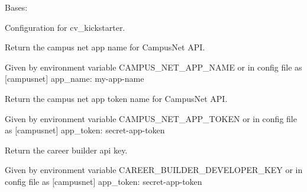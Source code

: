 \documentclass[letterpaper,10pt,english]{sphinxmanual}
\begin{document}
\begin{fulllineitems}
\label{cv_kickstarter:cv_kickstarter.cv_kickstarter_config.CvKickstarterConfig}
Bases: 

Configuration for cv\_kickstarter.

\begin{fulllineitems}
\label{cv_kickstarter:cv_kickstarter.cv_kickstarter_config.CvKickstarterConfig.campus_net_app_name}
Return the campus net app name for CampusNet API.

Given by environment variable CAMPUS\_NET\_APP\_NAME or in config file as
{[}campusnet{]}
app\_name: my-app-name

\end{fulllineitems}


\begin{fulllineitems}
\label{cv_kickstarter:cv_kickstarter.cv_kickstarter_config.CvKickstarterConfig.campus_net_app_token}
Return the campus net app token name for CampusNet API.

Given by environment variable CAMPUS\_NET\_APP\_TOKEN or in config file as
{[}campusnet{]}
app\_token: secret-app-token

\end{fulllineitems}


\begin{fulllineitems}
\label{cv_kickstarter:cv_kickstarter.cv_kickstarter_config.CvKickstarterConfig.career_builder_key}
Return the career builder api key.

Given by environment variable CAREER\_BUILDER\_DEVELOPER\_KEY or
in config file as
{[}campusnet{]}
app\_token: secret-app-token

\end{fulllineitems}



\end{fulllineitems}
\end{document}
